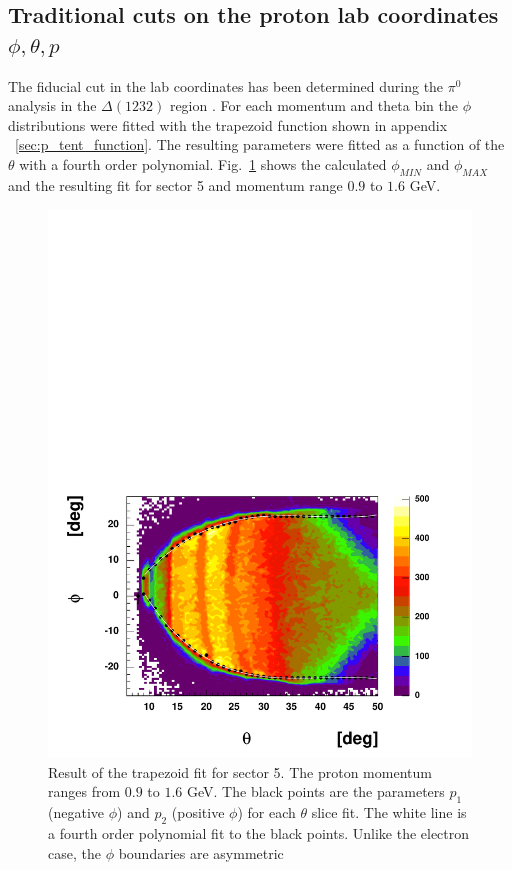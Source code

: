 \subsection{Traditional cuts on the proton lab coordinates $\phi, \theta, p$}
The fiducial cut in the lab coordinates has been determined during the $\pi^0$ analysis in
the $\Delta(1232)$ region \cite{bib:pi0_Delta}.
For each momentum and theta bin the $\phi$ distributions were fitted with the trapezoid function shown in appendix ~\ref{sec:p_tent_function}.
The resulting parameters were fitted as a function of the $\theta$ with a fourth order polynomial.
Fig.~\ref{fig:traped_fit_result_s5} shows the calculated $\phi_{MIN}$ and $\phi_{MAX}$  and the resulting fit
for sector 5 and momentum range $0.9$ to $1.6$ GeV.

\begin{figure}[h]
    \begin{center}
        \includegraphics[width = 13cm, bb=0 0 580 430]{img/traped_fit_result_s5}
        \caption[Result of the trapezoid fit]
        { Result of the trapezoid fit for sector 5. The proton momentum ranges from $0.9$ to $1.6$ GeV.
        The black points are the parameters $p_1$ (negative $\phi$) and $p_2$ (positive $\phi$)
            for each $\theta$ slice fit.
        The white line is a fourth order polynomial fit to the black points.
        Unlike the electron case, the $\phi$ boundaries are asymmetric}
        \label{fig:traped_fit_result_s5}
    \end{center}
\end{figure}

